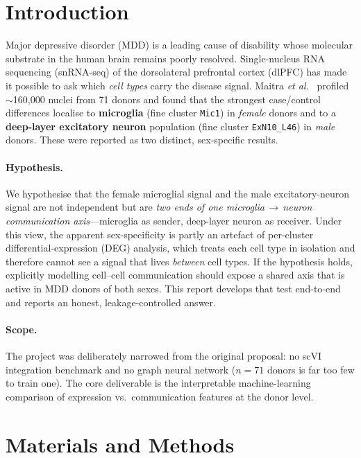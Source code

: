 \documentclass[11pt]{article}
\newcommand{\code}[1]{\texttt{\small #1}}
\begin{document}
\section{Introduction}

Major depressive disorder (MDD) is a leading cause of disability whose
molecular substrate in the human brain remains poorly resolved. Single-nucleus
RNA sequencing (snRNA-seq) of the dorsolateral prefrontal cortex (dlPFC) has
made it possible to ask which \emph{cell types} carry the disease signal.
Maitra \textit{et al.}~\cite{maitra2023} profiled $\sim$160{,}000 nuclei from
71 donors and found that the strongest case/control differences localise to
\textbf{microglia} (fine cluster \code{Mic1}) in \emph{female} donors and to a
\textbf{deep-layer excitatory neuron} population (fine cluster
\code{ExN10\_L46}) in \emph{male} donors. These were reported as two distinct,
sex-specific results.

\paragraph{Hypothesis.} We hypothesise that the female microglial signal and
the male excitatory-neuron signal are not independent but are \emph{two ends of
one microglia\,$\rightarrow$\,neuron communication axis}---microglia as sender,
deep-layer neuron as receiver. Under this view, the apparent sex-specificity is
partly an artefact of per-cluster differential-expression (DEG) analysis, which
treats each cell type in isolation and therefore cannot see a signal that lives
\emph{between} cell types. If the hypothesis holds, explicitly modelling
cell--cell communication should expose a shared axis that is active in MDD
donors of both sexes. This report develops that test end-to-end and reports an
honest, leakage-controlled answer.

\paragraph{Scope.} The project was deliberately narrowed from the original
proposal: no scVI integration benchmark and no graph neural network ($n=71$
donors is far too few to train one). The core deliverable is the
interpretable machine-learning comparison of expression vs.\ communication
features at the donor level.

\section{Materials and Methods}
\end{document}
